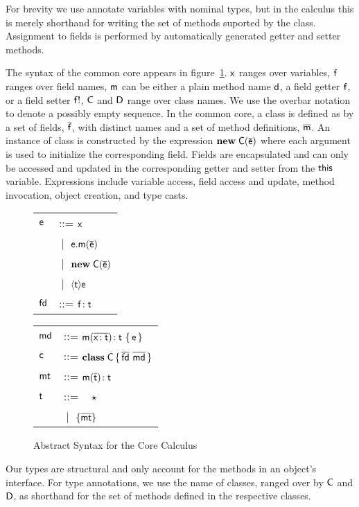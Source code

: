 \documentclass[preprint]{sigplanconf}
\newcommand{\fd}{\M{\xt{fd}}}
\newcommand{\md}{\M{\xt{md}}}
\newcommand{\mt}{\M{\xt{mt}}}
\newcommand{\m}{\M{\xt{m}}}
\newcommand{\e}{\M{\xt{e}}}
\renewcommand{\d}{\M{\xt{d}}}
\newcommand{\f}{\M{\xt{f}}}
\newcommand{\fb}{\M{\xt{f!}}}
\newcommand{\x}{\M{\xt{x}}}
\renewcommand{\t}{\M{\xt{t}}}
\renewcommand{\c}{\M{\xt{c}}}
\newcommand{\C}{\M{\xt{C}}}
\newcommand{\D}{\M{\xt{D}}}
\newcommand{\this}{\M{\xt{this}}}
\renewcommand{\d}{\M{\xt{d}}}
\newcommand{\new}{\M{\bt{new}}}
\newcommand{\Get}[2]{\M{#1.#2}}
\newcommand{\Set}[3]{\M{#1.#2:=#3}}
\newcommand{\Call}[3]{\M{#1.#2(#3)}}
\newcommand{\New}[2]{\M{\new\;#1({#2})}}
\newcommand{\Cast}[2]{\M{\langle{#1}\rangle{#2}}}
\newcommand{\any}{\M{\star}}
\newcommand{\Type}[1]{\M{\{ #1 \}}}
\newcommand{\HT}[2]{\M{{#1}\!:{#2}}}
\newcommand{\Mdef}[5]{\M{ \HT { #1( \b{\HT{#2}{#3}})}{#4}~ \{\, {#5} \,\} }}
\newcommand{\Ftype}[2]{\M{ \HT{#1}{#2} }}
\newcommand{\Mtype}[3]{\M{ \HT { #1( #2 )}{#3}}}
\newcommand{\Class}[3]{\M{\bt{class}\;#1\,\{\, #2 ~ #3\, \}}}
\newcommand{\Alt}[1]{ &\B #1 \\}
\newcommand{\B}{\M{~|~}}
\newcommand{\M}[1]{\ensuremath{#1}\xspace}
\newcommand{\xt}[1]{{\sf{#1}}\xspace}
\newcommand{\bt}[1]{\xt{\bf #1}}
\renewcommand{\b}[1]{\M{\overline{#1}}}
\begin{document}
For brevity we use annotate variables with nominal types, but in the
calculus this is merely shorthand for writing the set of methods suported 
by the class. Assignment to fields is performed by automatically generated
getter and setter methods.

The syntax of the common core appears in figure~\ref{syn}.  \x ranges
over variables, \f ranges over field names, \m can be either a plain method
name \d, a field getter \f, or a field setter \fb, \C and \D range over
class names. We use the overbar notation to denote a possibly empty
sequence. In the common core, a class is defined as by a set of fields,
\b\f, with distinct names and a set of method definitions, \b\m. An instance
of class is constructed by the expression \New\C{\b\e} where each argument
is used to initialize the corresponding field. Fields are encapsulated and
can only be accessed and updated in the corresponding getter and setter from
the \this variable.  Expressions include variable access, field access and
update, method invocation, object creation, and type casts.



\begin{figure}[!h]\center\begin{minipage}{4cm}\begin{tabular}{l@{~~~}l}
\e &::=  \x \\
   \Alt{ \Call\e\m{\b\e} }
   \Alt{ \New\C{\b\e} }
   \Alt{ \Cast\t\e }
\fd &::= 
    \Ftype\f\t   \\
\end{tabular}\end{minipage}\begin{minipage}{4cm}\begin{tabular}{l@{~~~}l}
\md &::=
    \Mdef\m\x\t\t\e \\
\c &::= \Class \C {\b{\fd}}{\b{\md} } \\
\mt &::= \Mtype\m{\b\t}\t\\
\t &::= ~ \any \\
   \Alt{ \Type{  \b{ \mt } } }
\end{tabular}\end{minipage}
\caption{Abstract Syntax for the Core Calculus}\label{syn}
\end{figure}

Our types are structural and only account for the methods in an object's
interface. For type annotations, we use the name of classes, ranged over by
\C and \D, as shorthand for the set of methods defined in the respective
classes.
\end{document}
